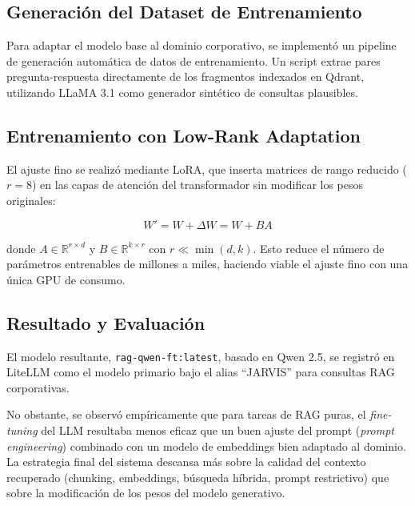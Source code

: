 \subsection{Generación del Dataset de Entrenamiento}

Para adaptar el modelo base al dominio corporativo, se implementó un pipeline de generación automática de datos de entrenamiento. Un script extrae pares pregunta-respuesta directamente de los fragmentos indexados en Qdrant, utilizando LLaMA 3.1 como generador sintético de consultas plausibles.

\subsection{Entrenamiento con Low-Rank Adaptation}

El ajuste fino se realizó mediante LoRA, que inserta matrices de rango reducido ($r=8$) en las capas de atención del transformador sin modificar los pesos originales:

\begin{equation}
W' = W + \Delta W = W + BA
\end{equation}

donde $A \in \mathbb{R}^{r \times d}$ y $B \in \mathbb{R}^{k \times r}$ con $r \ll \min(d,k)$. Esto reduce el número de parámetros entrenables de millones a miles, haciendo viable el ajuste fino con una única GPU de consumo.

\subsection{Resultado y Evaluación}

El modelo resultante, \texttt{rag-qwen-ft:latest}, basado en Qwen 2.5, se registró en LiteLLM como el modelo primario bajo el alias ``JARVIS'' para consultas RAG corporativas.

No obstante, se observó empíricamente que para tareas de RAG puras, el \textit{fine-tuning} del LLM resultaba menos eficaz que un buen ajuste del prompt (\textit{prompt engineering}) combinado con un modelo de embeddings bien adaptado al dominio. La estrategia final del sistema descansa más sobre la calidad del contexto recuperado (chunking, embeddings, búsqueda híbrida, prompt restrictivo) que sobre la modificación de los pesos del modelo generativo.
